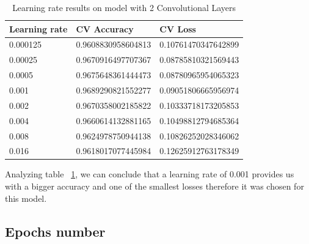 \documentclass[conference]{IEEEtran}
\begin{document}
\begin{table}[H]
\centering
\caption{Learning rate results on model with 2 Convolutional Layers}
\label{table:model2_learning_rate}
\begin{tabular}{ | m{3.5em} | m{3.2cm}| m{3.2cm} | } 
\hline
Learning rate & CV Accuracy & CV Loss \\ 
\hline
0.000125 & 0.9608830958604813 & 0.10761470347642899 \\
\hline
0.00025 & 0.9670916497707367 & 0.08785810321569443 \\
\hline
0.0005 & 0.9675648361444473 & 0.08780965954065323 \\
\hline
0.001 & 0.9689290821552277 & 0.09051806665956974 \\
\hline
0.002 & 0.9670358002185822 & 0.10333718173205853 \\
\hline
0.004 & 0.9660614132881165 & 0.10498812794685364 \\
\hline
0.008 & 0.9624978750944138 & 0.10826252028346062 \\
\hline
0.016 & 0.9618017077445984 & 0.12625912763178349 \\
\hline
\end{tabular}
\end{table}

Analyzing table ~\ref{table:model2_learning_rate}, we can conclude that a learning rate of 0.001 provides us with a bigger accuracy and one of the smallest losses therefore it was chosen for this model.

\subsection{Epochs number \cite{K}}
\end{document}
